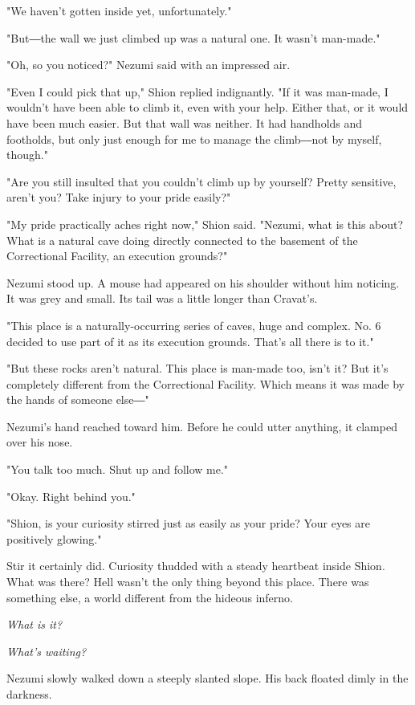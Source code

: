 "We haven't gotten inside yet, unfortunately."

"But―the wall we just climbed up was a natural one. It wasn't man-made."

"Oh, so you noticed?" Nezumi said with an impressed air.

"Even I could pick that up," Shion replied indignantly. "If it was
man-made, I wouldn't have been able to climb it, even with your help.
Either that, or it would have been much easier. But that wall was
neither. It had handholds and footholds, but only just enough for me to
manage the climb―not by myself, though."

"Are you still insulted that you couldn't climb up by yourself? Pretty
sensitive, aren't you? Take injury to your pride easily?"

"My pride practically aches right now," Shion said. "Nezumi, what is
this about? What is a natural cave doing directly connected to the
basement of the Correctional Facility, an execution grounds?"

Nezumi stood up. A mouse had appeared on his shoulder without him
noticing. It was grey and small. Its tail was a little longer than
Cravat's.

"This place is a naturally-occurring series of caves, huge and complex.
No. 6 decided to use part of it as its execution grounds. That's all
there is to it."

"But these rocks aren't natural. This place is man-made too, isn't it?
But it's completely different from the Correctional Facility. Which
means it was made by the hands of someone else―"

Nezumi's hand reached toward him. Before he could utter anything, it
clamped over his nose.

"You talk too much. Shut up and follow me."

"Okay. Right behind you."

"Shion, is your curiosity stirred just as easily as your pride? Your
eyes are positively glowing."

Stir it certainly did. Curiosity thudded with a steady heartbeat inside
Shion. What was there? Hell wasn't the only thing beyond this place.
There was something else, a world different from the hideous inferno.

\emph{What is it?}

\emph{What's waiting?}

Nezumi slowly walked down a steeply slanted slope. His back floated
dimly in the darkness.

